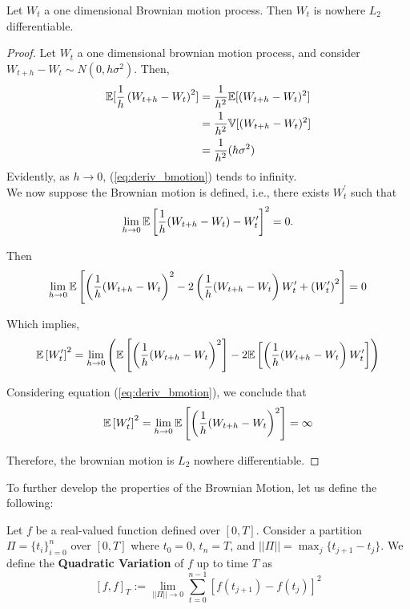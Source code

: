 \documentclass[../TGMAFFIRO]{subfiles}
\begin{document}
\begin{proposition}
	Let $W_t$ a one dimensional Brownian motion process. Then $W_t$ is nowhere $L_2$ differentiable.
\end{proposition}
\begin{proof}
Let $W_t$ a one dimensional brownian motion process, and consider $W_{t+h} - W_t \sim N(0, h\sigma^2)$. Then,
\begin{align}
	\mathbb{E}[\frac{1}{h}\left(W_{t+h} - W_t\right)^2] &= \frac{1}{h^2}\mathbb{E}[(W_{t+h} - W_t)^2] \nonumber\\
												&= \frac{1}{h^2}\mathbb{V}[(W_{t+h} - W_t)^2] \nonumber\\
												&= \frac{1}{h^2}(h\sigma^2)\label{eq:deriv_bmotion}
\end{align}
Evidently, as $h\to 0$, (\ref{eq:deriv_bmotion}) tends to infinity.\\

We now suppose the Brownian motion is defined, i.e., there exists $W_t^\prime$ such that
\begin{equation}
  \lim_{h\to 0}\mathbb{E}\left[\frac{1}{h}(W_{t+h} - W_t) - W_t^\prime\right]^2 = 0.
\end{equation}

Then
\begin{equation}
  \lim_{h\to 0}\mathbb{E}\left[\left(\frac{1}{h}(W_{t+h} - W_t\right)^2 -
  					   2\left(\frac{1}{h}(W_{t+h} - W_t\right)W_t^\prime + 
  					   \left(W_t^\prime\right)^2\right] = 0
\end{equation}

Which implies,
\begin{equation*}
	\mathbb{E}\left[W_t^\prime\right]^2 =  \lim_{h\to 0}\left(\mathbb{E}\left[\left(\frac{1}{h}(W_{t+h} - W_t\right)^2\right] -
  					   2\mathbb{E}\left[\left(\frac{1}{h}(W_{t+h} - W_t\right)W_t^\prime\right]\right)
\end{equation*}

Considering equation (\ref{eq:deriv_bmotion}), we conclude that
\begin{equation*}
	\mathbb{E}\left[W_t^\prime\right]^2 =  \lim_{h\to 0}\mathbb{E}\left[\left(\frac{1}{h}(W_{t+h} - W_t\right)^2\right] = \infty
\end{equation*}

Therefore, the brownian motion is $L_2$ nowhere differentiable.
\end{proof}

To further develop the properties of the Brownian Motion, let us define the following:
\begin{definition}\label{def:quadratic_variation}
	Let $f$ be a real-valued function defined over $[0, T]$. Consider a partition $\Pi= \{t_i\}_{i=0}^{n}$ over $[0, T]$ where $t_0 = 0$, $t_n = T$, and $||\Pi|| = \max_j\{t_{j+1} - t_j\}$. We define the \textbf{Quadratic Variation} of $f$ up to time $T$ as
	\[
		[f, f]_T := \lim_{||\Pi|| \to 0} \sum_{t=0}^{n-1}\left[f(t_{j+1}) - f(t_{j})\right]^2
	\]
\end{definition}
\end{document}
